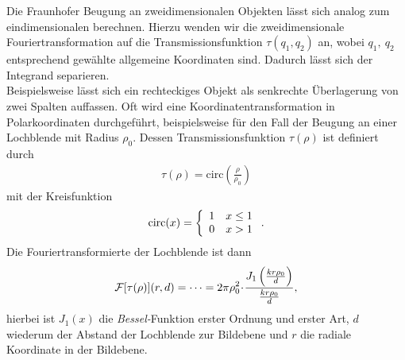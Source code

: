 Die Fraunhofer Beugung an zweidimensionalen Objekten lässt sich analog zum eindimensionalen berechnen. Hierzu wenden wir die zweidimensionale Fouriertransformation auf die Transmissionsfunktion $\tau(q_1,q_2)$ an, wobei $q_1,~q_2$ entsprechend gewählte allgemeine Koordinaten sind. Dadurch lässt sich der Integrand separieren.\\
Beispielsweise lässt sich ein rechteckiges Objekt als senkrechte Überlagerung von zwei Spalten auffassen. Oft wird eine Koordinatentransformation in Polarkoordinaten durchgeführt, beispielsweise für den Fall der Beugung an einer Lochblende mit Radius $\rho_0$. Dessen Transmissionsfunktion $\tau(\rho)$ ist definiert durch
\begin{align}
\tau(\rho)=\mathrm{circ}\left(\frac{\rho}{\rho_0}\right)
\end{align}
mit der Kreisfunktion
\begin{align}
\mathrm{circ}(x)=\left\{
	\begin{array}{l l}
	1 \quad x\le 1\\
	0 \quad x > 1
	\end{array}
	\right. .
\end{align}
Die Fouriertransformierte der Lochblende ist dann
\begin{align}
\mathcal{F}[\tau(\rho)](r,d)=\dots =2\pi\rho_0^2\!\cdot\!\frac{J_1\left(\frac{kr\rho_0}{d}\right)}{\frac{kr\rho_0}{d}},
\end{align}
hierbei ist $J_1(x)$ die \emph{Bessel-}Funktion erster Ordnung und erster Art, $d$ wiederum der Abstand der Lochblende zur Bildebene und $r$ die radiale Koordinate in der Bildebene.
